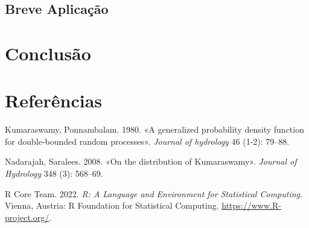 \documentclass[
]{article}
\newlength{\cslhangindent}
\newlength{\cslentryspacingunit} %
\newenvironment{CSLReferences}[2] %
 {%
  \setlength{\parindent}{0pt}
  \ifodd #1
  \let\oldpar\par
  \def\par{\hangindent=\cslhangindent\oldpar}
  \fi
  \setlength{\parskip}{#2\cslentryspacingunit}
 }%
 {}
\begin{document}
\subsection{Breve Aplicação}

\section{\centering Conclusão}

\section{\centering Referências}

\hypertarget{refs}{}
\begin{CSLReferences}{1}{0}
\leavevmode{}%
Kumaraswamy, Ponnambalam. 1980. {«A generalized probability density
function for double-bounded random processes»}. \emph{Journal of
hydrology} 46 (1-2): 79--88.

\leavevmode{}%
Nadarajah, Saralees. 2008. {«On the distribution of Kumaraswamy»}.
\emph{Journal of Hydrology} 348 (3): 568--69.

\leavevmode{}%
R Core Team. 2022. \emph{R: A Language and Environment for Statistical
Computing}. Vienna, Austria: R Foundation for Statistical Computing.
\url{https://www.R-project.org/}.

\end{CSLReferences}
\end{document}
